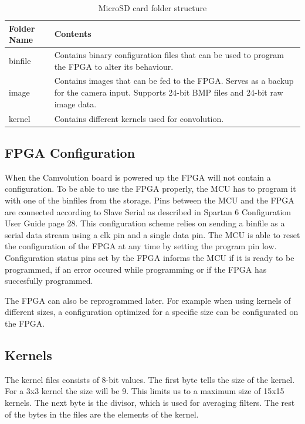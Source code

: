 \begin{table}[h!]
\centering
	\begin{tabular}{ | l | p{10cm} |}
		\hline
		Folder Name & Contents \\ \hline
		binfile & Contains binary configuration files that can be used to program the FPGA to alter its behaviour. \\ \hline
		image & Contains images that can be fed to the FPGA. Serves as a backup for the camera input. Supports 24-bit BMP files and 24-bit raw image data. \\ \hline
		kernel & Contains different kernels used for convolution. \\ \hline
	\end{tabular}
	\caption{MicroSD card folder structure}
	\label{microsd_folder}
\end{table}


\subsection{FPGA Configuration}
When the Camvolution board is powered up the FPGA will not contain a configuration. To be able to use the FPGA properly, the MCU has to program it with one of the binfiles from the storage. Pins between the MCU and the FPGA are connected according to Slave Serial as described in Spartan 6 Configuration User Guide\cite{ug380} page 28. This configuration scheme relies on sending a binfile as a serial data stream using a clk pin and a single data pin. The MCU is able to reset the configuration of the FPGA at any time by setting the program pin low. Configuration status pins set by the FPGA informs the MCU if it is ready to be programmed, if an error occured while programming or if the FPGA has succesfully programmed. 

The FPGA can also be reprogrammed later. For example when using kernels of different sizes, a configuration optimized for a specific size can be configurated on the FPGA.


\subsection{Kernels}
The kernel files consists of 8-bit values. The first byte tells the size of the kernel. For a 3x3 kernel the size will be 9. This limits us to a maximum size of 15x15 kernels. The next byte is the divisor, which is used for averaging filters. The rest of the bytes in the files are the elements of the kernel.


